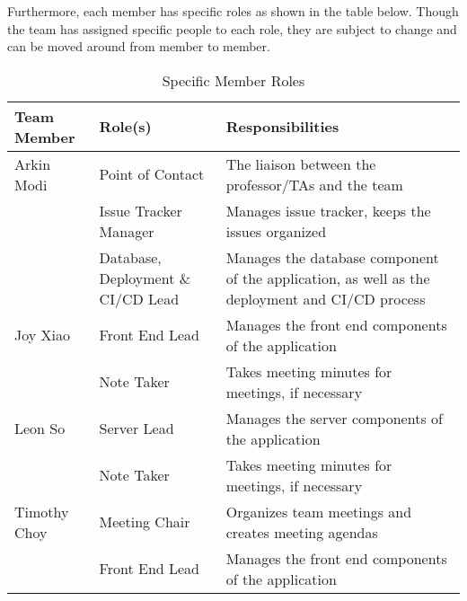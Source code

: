 \documentclass{article}
\begin{document}
Furthermore, each member has specific roles as shown in the table below. Though the team has
assigned specific people to each role, they are subject to change and can be moved around from
member to member.

\begin{table}[H]
	\centering
	\caption{Specific Member Roles}
	\vspace{5pt}
	\begin{tabular}{|p{}|p{}|p{}|}
		\hline
		\textbf{Team Member} & \textbf{Role(s)}                   & \textbf{Responsibilities}                             \\
		\hline
		Arkin Modi           & Point of Contact                   & The liaison between the professor/TAs
		and the team                                                                                                      \\
		\cline{2-3}
		                     & Issue Tracker Manager              & Manages issue tracker, keeps the issues
		organized                                                                                                         \\
		\cline{2-3}
		                     & Database, Deployment \& CI/CD Lead & Manages the database component of the application, as
		well as the deployment and CI/CD process                                                                          \\
		\hline
		Joy Xiao             & Front End Lead                     & Manages the front end components of the application   \\
		\cline{2-3}
		                     & Note Taker                         & Takes meeting minutes for meetings, if necessary      \\
		\hline
		Leon So              & Server Lead                        & Manages the server components of the application      \\
		\cline{2-3}
		                     & Note Taker                         & Takes meeting minutes for meetings, if necessary      \\
		\hline
		Timothy Choy         & Meeting Chair                      & Organizes team meetings and creates meeting agendas   \\
		\cline{2-3}
		                     & Front End Lead                     & Manages the front end components of the application   \\
		\hline
	\end{tabular}
\end{table}
\end{document}
